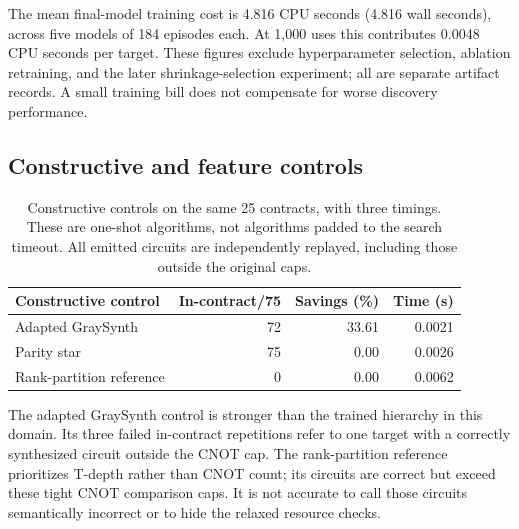 The mean final-model training cost is 4.816 CPU seconds (4.816 wall seconds), across five models of 184 episodes each. At 1,000 uses this contributes 0.0048 CPU seconds per target. These figures exclude hyperparameter selection, ablation retraining, and the later shrinkage-selection experiment; all are separate artifact records. A small training bill does not compensate for worse discovery performance.

\subsection{Constructive and feature controls}

\begin{table}[htbp]\centering\small

\begin{tabular}{@{}lrrr@{}}\toprule

Constructive control & In-contract/75 & Savings (\%) & Time (s) \\\midrule

Adapted GraySynth & 72 & 33.61 & 0.0021 \\

Parity star & 75 & 0.00 & 0.0026 \\

Rank-partition reference & 0 & 0.00 & 0.0062 \\

\bottomrule\end{tabular}

\caption{Constructive controls on the same 25 contracts, with three timings. These are one-shot algorithms, not algorithms padded to the search timeout. All emitted circuits are independently replayed, including those outside the original caps.}\label{tab:constructive}\end{table}

The adapted GraySynth control is stronger than the trained hierarchy in this domain. Its three failed in-contract repetitions refer to one target with a correctly synthesized circuit outside the CNOT cap. The rank-partition reference prioritizes T-depth rather than CNOT count; its circuits are correct but exceed these tight CNOT comparison caps. It is not accurate to call those circuits semantically incorrect or to hide the relaxed resource checks.

